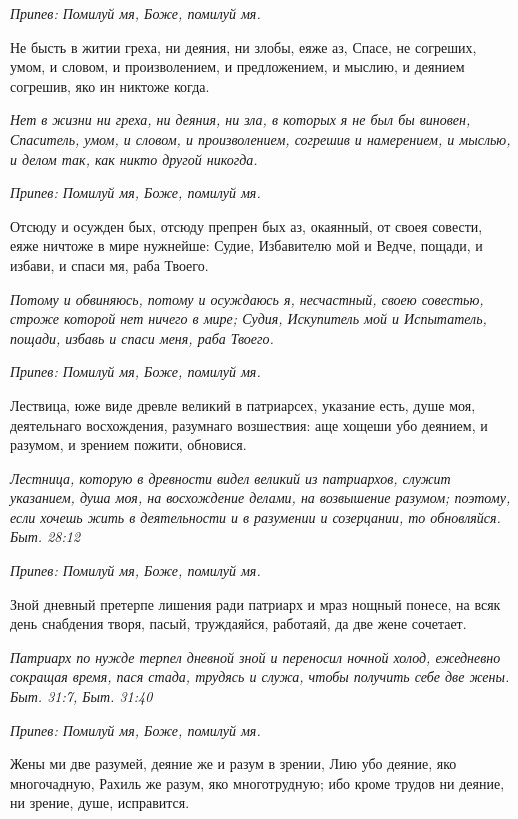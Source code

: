 \itshape Припев:\normalfont{} Помилуй мя, Боже, помилуй мя.


Не бысть в житии греха, ни деяния, ни злобы, еяже аз, Спасе, не согреших, умом, и словом, и произволением, и предложением, и мыслию, и деянием согрешив, яко ин никтоже когда.


\itshape Нет в жизни ни греха, ни деяния, ни зла, в которых я не был бы виновен, Спаситель, умом, и словом, и произволением, согрешив и намерением, и мыслью, и делом так, как никто другой никогда.\normalfont{}


\itshape Припев:\normalfont{} Помилуй мя, Боже, помилуй мя.


Отсюду и осужден бых, отсюду препрен бых аз, окаянный, от своея совести, еяже ничтоже в мире нужнейше: Судие, Избавителю мой и Ведче, пощади, и избави, и спаси мя, раба Твоего.


\itshape Потому и обвиняюсь, потому и осуждаюсь я, несчастный, своею совестью, строже которой нет ничего в мире; Судия, Искупитель мой и Испытатель, пощади, избавь и спаси меня, раба Твоего.\normalfont{}


\itshape Припев:\normalfont{} Помилуй мя, Боже, помилуй мя.


Лествица, юже виде древле великий в патриарсех, указание есть, душе моя, деятельнаго восхождения, разумнаго возшествия: аще хощеши убо деянием, и разумом, и зрением пожити, обновися.


\itshape Лестница, которую в древности видел великий из патриархов, служит указанием, душа моя, на восхождение делами, на возвышение разумом; поэтому, если хочешь жить в деятельности и в разумении и созерцании, то обновляйся. Быт. 28:12\normalfont{}


\itshape Припев:\normalfont{} Помилуй мя, Боже, помилуй мя.


Зной дневный претерпе лишения ради патриарх и мраз нощный понесе, на всяк день снабдения творя, пасый, труждаяйся, работаяй, да две жене сочетает.


\itshape Патриарх по нужде терпел дневной зной и переносил ночной холод, ежедневно сокращая время, пася стада, трудясь и служа, чтобы получить себе две жены. Быт. 31:7, Быт. 31:40\normalfont{}


\itshape Припев:\normalfont{} Помилуй мя, Боже, помилуй мя.


Жены ми две разумей, деяние же и разум в зрении, Лию убо деяние, яко многочадную, Рахиль же разум, яко многотрудную; ибо кроме трудов ни деяние, ни зрение, душе, исправится.


